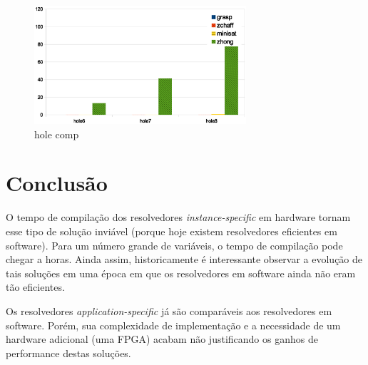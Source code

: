 \documentclass[12pt,a4paper]{article}
\begin{document}
\begin{figure}[H]
    \centering
    \includegraphics[width=0.7\textwidth]{figures/hole-comp}
    \caption{hole comp}
    \label{fig:hole-comp}
\end{figure}

\section{Conclusão}

O tempo de compilação dos resolvedores \textit{instance-specific} em hardware tornam esse tipo de solução inviável (porque hoje existem resolvedores eficientes em software). Para um número grande de variáveis, o tempo de compilação pode chegar a horas. Ainda assim, historicamente é interessante observar a evolução de tais soluções em uma época em que os resolvedores em software ainda não eram tão eficientes.

Os resolvedores \textit{application-specific} já são comparáveis aos resolvedores em software. Porém, sua complexidade de implementação e a necessidade de um hardware adicional (uma FPGA) acabam não justificando os ganhos de performance destas soluções.



\end{document}
